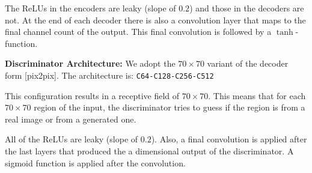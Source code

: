 \documentclass{llncs}
\begin{document}
\begin{subappendices}
The ReLUs in the encoders are leaky (slope of $0.2$) and those in the decoders are not. At the end of each decoder there is also a convolution layer that maps to the final channel count of the output. This final convolution is followed by a $\tanh$-function.

\noindent\textbf{Discriminator Architecture:}
We adopt the $70\times70$ variant of the decoder form [pix2pix]. The architecture is:\newline
\texttt{C64-C128-C256-C512}

This configuration results in a receptive field of $70\times70$. This means that for each $70\times70$ region of the input, the discriminator tries to guess if the region is from a real image or from a generated one.

All of the ReLUs are leaky (slope of $0.2$). Also, a final convolution is applied after the last layers that produced the a dimensional output of the discriminator. A sigmoid function is applied after the convolution.

\end{subappendices}
\end{document}
